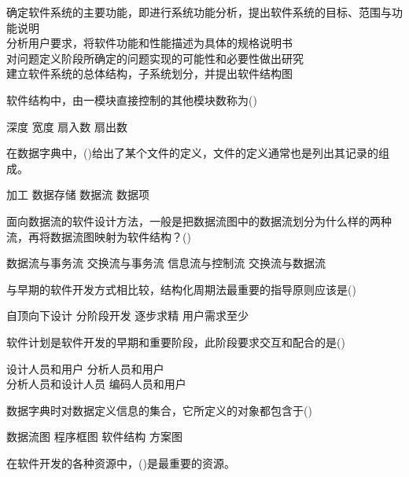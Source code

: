 \documentclass[answers]{exam}
\begin{document}
\begin{questions}
	\begin{oneparchoices}
		\choice 确定软件系统的主要功能，即进行系统功能分析，提出软件系统的目标、范围与功能说明\\
		\choice 分析用户要求，将软件功能和性能描述为具体的规格说明书\\
		\choice 对问题定义阶段所确定的问题实现的可能性和必要性做出研究\\
		\correctchoice 建立软件系统的总体结构，子系统划分，并提出软件结构图
	\end{oneparchoices}
	\question 软件结构中，由一模块直接控制的其他模块数称为()\\
	\begin{oneparchoices}
		\choice 深度
		\choice 宽度
		\choice 扇入数
		\correctchoice 扇出数
	\end{oneparchoices}
	\question 在数据字典中，()给出了某个文件的定义，文件的定义通常也是列出其记录的组成。\\
	\begin{oneparchoices}
		\choice 加工
		\correctchoice 数据存储
		\choice 数据流
		\choice 数据项
	\end{oneparchoices}
	\question 面向数据流的软件设计方法，一般是把数据流图中的数据流划分为什么样的两种流，再将数据流图映射为软件结构？()\\
	\begin{oneparchoices}
		\choice 数据流与事务流
		\correctchoice 交换流与事务流
		\choice 信息流与控制流
		\choice 交换流与数据流
	\end{oneparchoices}
	\question 与早期的软件开发方式相比较，结构化周期法最重要的指导原则应该是()\\
	\begin{oneparchoices}
		\choice 自顶向下设计
		\correctchoice 分阶段开发
		\choice 逐步求精
		\choice 用户需求至少
	\end{oneparchoices}
	\question 软件计划是软件开发的早期和重要阶段，此阶段要求交互和配合的是()\\
	\begin{oneparchoices}
		\choice 设计人员和用户
		\correctchoice 分析人员和用户\\
		\choice 分析人员和设计人员
		\choice 编码人员和用户
	\end{oneparchoices}
	\question 数据字典时对数据定义信息的集合，它所定义的对象都包含于()\\
	\begin{oneparchoices}
		\correctchoice 数据流图
		\choice 程序框图
		\choice 软件结构
		\choice 方案图
	\end{oneparchoices}
	\question 在软件开发的各种资源中，()是最重要的资源。\\

\end{questions}
\end{document}
